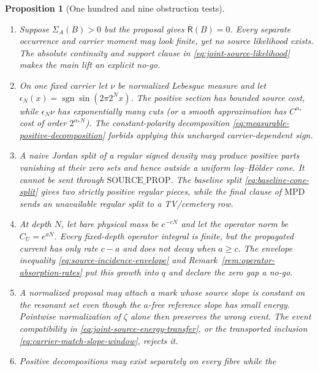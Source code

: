 \documentclass[11pt]{article}
\newtheorem{proposition}[theorem]{Proposition}
\begin{document}
\begin{proposition}[One hundred and nine obstruction tests]
\begin{enumerate}[label=\textup{(T\arabic*)}]
      $\|d\mathsf R_0(\cdot\mid A)/d\mathsf R_0\|_p
       =\delta^{-1/p'}$.  A scale-free normalized selected likelihood would
      hide exactly this blow-up.  Equation
      \eqref{eq:selection-safe-likelihood-rates} records it, and
      \eqref{eq:source-value-small-ball} rejects a nonpositive resulting
      gap.
\item Suppose $\Sigma_A(B)>0$ but the proposal gives
      $\overline{\mathsf R}(B)=0$.  Every separate occurrence and carrier
      moment may look finite, yet no source likelihood exists.  The absolute
      continuity and support clause in \eqref{eq:joint-source-likelihood}
      makes the main lift an explicit no-go.
\item On one fixed carrier let $\nu$ be normalized Lebesgue measure and let
      $\epsilon_N(x)=\operatorname{sgn}\sin(2\pi2^Nx)$.  The positive
      section has bounded source cost, while $\epsilon_N\nu$ has
      exponentially many cuts (or a smooth approximation has
      $C^{\alpha_*}$ cost of order $2^{\alpha_*N}$).  The constant-polarity
      decomposition \eqref{eq:measurable-positive-decomposition} forbids
      applying this uncharged carrier-dependent sign.
\item A naive Jordan split of a regular signed density may produce positive
      parts vanishing at their zero sets and hence outside a uniform
      log--H\"older cone.  It cannot be sent through
      $\mathrm{SOURCE\_PROP}$.  The baseline split
      \eqref{eq:baseline-cone-split} gives two strictly positive regular
      pieces, while the final clause of $\mathrm{MPD}$ sends an unavailable
      regular split to a TV/cemetery row.
\item At depth $N$, let bare physical mass be $e^{-cN}$ and let the operator
      norm be $C_U=e^{aN}$.  Every fixed-depth operator integral is finite,
      but the propagated current has only rate $c-a$ and does not decay when
      $a\ge c$.  The envelope inequality
      \eqref{eq:source-incidence-envelope} and
      Remark~\ref{rem:operator-absorption-rates} put this growth into $q$ and
      declare the zero gap a no-go.
\item A normalized proposal may attach a mark whose source slope is constant
      on the resonant set even though the $a$-free reference slope has small
      energy.  Pointwise normalization of $\zeta$ alone then preserves the
      wrong event.  The event compatibility in
      \eqref{eq:joint-source-energy-transfer}, or the transported inclusion
      \eqref{eq:carrier-match-slope-window}, rejects it.
\item Positive decompositions may exist separately on every fibre while the

\end{enumerate}
\end{proposition}
\end{document}
